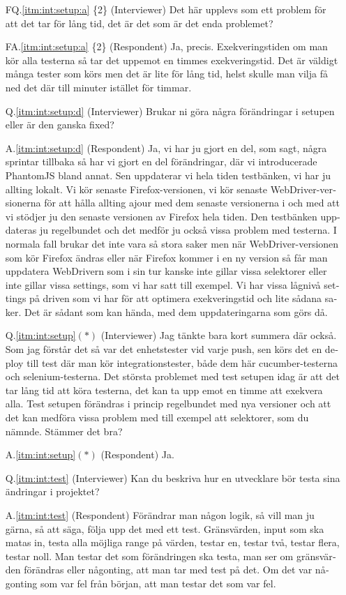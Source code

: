 \begin{otherlanguage}{swedish}
\begin{itemize}
  \item[FQ.\ref{itm:int:setup:a} \{2\}]\label{itm:fq2a:2} (Interviewer) Det här upplevs som ett problem för att det tar för lång tid, det är det som är det enda problemet?
  \item[FA.\ref{itm:int:setup:a} \{2\}] (Respondent) Ja, precis. Exekveringstiden om man kör alla testerna så tar det uppemot en timmes exekveringstid. Det är väldigt många tester som körs men det är lite för lång tid, helst skulle man vilja få ned det där till minuter istället för timmar.
  \item[Q.\ref{itm:int:setup:d}] (Interviewer) Brukar ni göra några förändringar i setupen eller är den ganska fixed?
  \item[A.\ref{itm:int:setup:d}] (Respondent) Ja, vi har ju gjort en del, som sagt, några sprintar tillbaka så har vi gjort en del förändringar, där vi introducerade PhantomJS bland annat. Sen uppdaterar vi hela tiden testbänken, vi har ju allting lokalt. Vi kör senaste Firefox-versionen, vi kör senaste WebDriver-versionerna för att hålla allting ajour med dem senaste versionerna i och med att vi stödjer ju den senaste versionen av Firefox hela tiden. Den testbänken uppdateras ju regelbundet och det medför ju också vissa problem med testerna. I normala fall brukar det inte vara så stora saker men när WebDriver-versionen som kör Firefox ändras eller när Firefox kommer i en ny version så får man uppdatera WebDrivern som i sin tur kanske inte gillar vissa selektorer eller inte gillar vissa settings, som vi har satt till exempel. Vi har vissa lågnivå settings på driven som vi har för att optimera exekveringstid och lite sådana saker. Det är sådant som kan hända, med dem uppdateringarna som görs då.
  \item[Q.\ref{itm:int:setup}$(*)$] (Interviewer) Jag tänkte bara kort summera där också. Som jag förstår det så var det enhetstester vid varje push, sen körs det en deploy till test där man kör integrationstester, både dem här cucumber-testerna och selenium-testerna. Det största problemet med test setupen idag är att det tar lång tid att köra testerna, det kan ta upp emot en timme att exekvera alla. Test setupen förändras i princip regelbundet med nya versioner och att det kan medföra vissa problem med till exempel att selektorer, som du nämnde. Stämmer det bra?
  \item[A.\ref{itm:int:setup}$(*)$] (Respondent) Ja.

\noindent\makebox[\linewidth]{\rule{\textwidth}{0.4pt}}

  \item[Q.\ref{itm:int:test}] (Interviewer) Kan du beskriva hur en utvecklare bör testa sina ändringar i projektet?
  \item[A.\ref{itm:int:test}] (Respondent) Förändrar man någon logik, så vill man ju gärna, så att säga, följa upp det med ett test. Gränsvärden, input som ska matas in, testa alla möjliga range på värden, testar en, testar två, testar flera, testar noll. Man testar det som förändringen ska testa, man ser om gränsvärden förändras eller någonting, att man tar med test på det. Om det var någonting som var fel från början, att man testar det som var fel. 
  

\end{itemize}
\end{otherlanguage}
